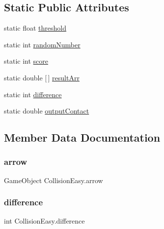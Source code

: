 \subsection*{Static Public Attributes}
\begin{DoxyCompactItemize}
\item 
static float \hyperlink{classCollisionEasy_a7c4fd8792b711e127d040db400c1d13b}{threshold}
\item 
static int \hyperlink{classCollisionEasy_a86ae72934ced374ad6783b8e6cc9c9cc}{random\+Number}
\item 
static int \hyperlink{classCollisionEasy_acd006e7d9ee11216baa466ebb5a416b0}{score}
\item 
static double \mbox{[}$\,$\mbox{]} \hyperlink{classCollisionEasy_ad2a058030ded429fe28222e15055aae4}{result\+Arr}
\item 
static int \hyperlink{classCollisionEasy_aef5e1833f5d38f1949bb752b5a677ca4}{difference}
\item 
static double \hyperlink{classCollisionEasy_a2d5d11ceeb3677effba4aa3e01ad2550}{output\+Contact}
\end{DoxyCompactItemize}


\subsection{Member Data Documentation}
\mbox{\label{classCollisionEasy_ac86c0e5618df773cbb8516c22ecb2941}} 
\subsubsection{\texorpdfstring{arrow}{arrow}}
{\footnotesize\ttfamily Game\+Object Collision\+Easy.\+arrow}

\mbox{\label{classCollisionEasy_aef5e1833f5d38f1949bb752b5a677ca4}} 
\subsubsection{\texorpdfstring{difference}{difference}}
{\footnotesize\ttfamily int Collision\+Easy.\+difference\hspace{0.3cm}{\ttfamily [static]}}

